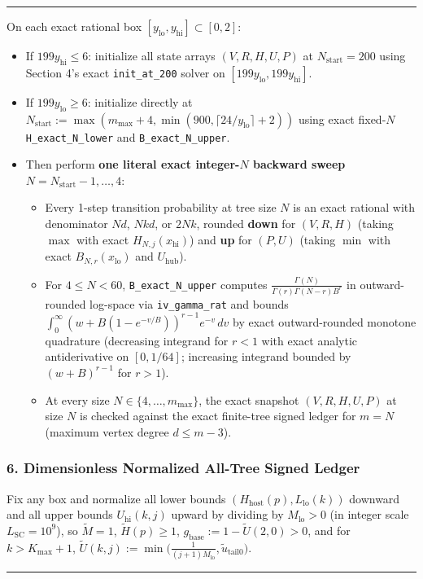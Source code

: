 \documentclass[11pt]{article}
\theoremstyle{remark}
\numberwithin{equation}{section}
\newenvironment{transcription}{\par\medskip\noindent\rule{\linewidth}{0.4pt}\par\nopagebreak}{\par\nopagebreak\noindent\rule{\linewidth}{0.4pt}\par\medskip}
\begin{document}
\begin{transcription}
On each exact rational box $[y_{\mathrm{lo}}, y_{\mathrm{hi}}] \subset [0, 2]$:
\begin{itemize}
\item If $199 y_{\mathrm{hi}} \le 6$: initialize all state arrays $(V, R, H, U, P)$ at $N_{\mathrm{start}} = 200$ using Section 4's exact \texttt{init\_at\_200} solver on $[199 y_{\mathrm{lo}}, 199 y_{\mathrm{hi}}]$.
\item If $199 y_{\mathrm{lo}} \ge 6$: initialize directly at $N_{\mathrm{start}} := \max(m_{\max} + 4, \min(900, \lceil 24/y_{\mathrm{lo}} \rceil + 2))$ using exact fixed-$N$ \texttt{H\_exact\_N\_lower} and \texttt{B\_exact\_N\_upper}.
\item Then perform \textbf{one literal exact integer-$N$ backward sweep} $N = N_{\mathrm{start}} - 1, \dots, 4$:
\begin{itemize}
\item Every 1-step transition probability at tree size $N$ is an exact rational with denominator $N d$, $N k d$, or $2 N k$, rounded \textbf{down} for $(V, R, H)$ (taking $\max$ with exact $H_{N, j}(x_{\mathrm{hi}})$) and \textbf{up} for $(P, U)$ (taking $\min$ with exact $B_{N, r}(x_{\mathrm{lo}})$ and $U_{\mathrm{hub}}$).
\item For $4 \le N < 60$, \texttt{B\_exact\_N\_upper} computes $\frac{\Gamma(N)}{\Gamma(r)\Gamma(N-r)B^r}$ in outward-rounded log-space via \texttt{iv\_gamma\_rat} and bounds $\int_0^\infty (w + B(1-e^{-v/B}))^{r-1} e^{-v}\,dv$ by exact outward-rounded monotone quadrature (decreasing integrand for $r < 1$ with exact analytic antiderivative on $[0, 1/64]$; increasing integrand bounded by $(w+B)^{r-1}$ for $r > 1$).
\item At every size $N \in \{4, \dots, m_{\max}\}$, the exact snapshot $(V, R, H, U, P)$ at size $N$ is checked against the exact finite-tree signed ledger for $m = N$ (maximum vertex degree $d \le m - 3$).
\end{itemize}
\end{itemize}


\subsubsection*{6. Dimensionless Normalized All-Tree Signed Ledger}

Fix any box and normalize all lower bounds $(H_{\mathrm{host}}(p), L_{\mathrm{lo}}(k))$ downward and all upper bounds $U_{\mathrm{hi}}(k, j)$ upward by dividing by $M_{\mathrm{lo}} > 0$ (in integer scale $L_{\mathrm{SC}} = 10^9$), so $\widetilde{M} = 1$, $\widetilde{H}(p) \ge 1$, $g_{\mathrm{base}} := 1 - \widetilde{U}(2, 0) > 0$, and for $k > K_{\max}+1$, $\widetilde{U}(k, j) := \min\big(\frac{1}{(j+1)M_{\mathrm{lo}}}, \widetilde{u}_{\mathrm{tail0}}\big)$.


\end{transcription}
\end{document}
